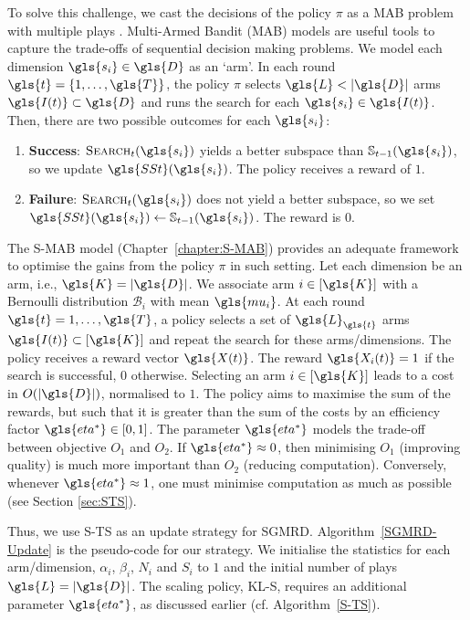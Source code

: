 To solve this challenge, we cast the decisions of the policy $\pi$ as a MAB problem with multiple plays  \cite{DBLP:conf/alt/UchiyaNK10}. Multi-Armed Bandit (MAB) models are useful tools to capture the trade-offs of sequential decision making problems. 
We model each dimension $\gls{s_i} \in \gls{D}$ as an `arm'. 
In each round $\gls{t}=\{1,\dots,\gls{T}\}$, the policy $\pi$ selects $\gls{L} < |\gls{D}|$ arms $\gls{I(t)} \subset \gls{D}$ and runs the search for each $\gls{s_i} \in \gls{I(t)}$. Then, there are two possible outcomes for each $\gls{s_i}$:  
\begin{enumerate}[noitemsep]
	\item \textbf{Success}: $\textsc{Search}_t(\gls{s_i})$ yields a better subspace than $\mathbb{S}_{t-1}(\gls{s_i})$, 
	so we update $\gls{SSt}(\gls{s_i})$. The policy receives a reward of $1$. 
	\item \textbf{Failure}: $\textsc{Search}_t(\gls{s_i})$ does not yield a better subspace, so we set $\gls{SSt}(\gls{s_i}) \gets \mathbb{S}_{{{t}}-1}(\gls{s_i})$. The reward is $0$. 
\end{enumerate}

The \acrshort{S-MAB} model \cite{DBLP:conf/kdd/FoucheKB19} (Chapter~\ref{chapter:S-MAB}) provides an adequate framework to optimise the gains from the policy $\pi$ in such setting. Let each dimension be an arm, i.e., $\gls{K} = |\gls{D}|$. We associate arm $i \in [\gls{K}]$ with a Bernoulli distribution $\mathcal{B}_i$ with mean $\gls{mu_i}$. At each round $\gls{t} = 1, \dots, \gls{T}$, a policy selects a set of $\gls{L}_{\gls{t}}$ arms $\gls{I(t)} \subset [\gls{K}]$ and repeat the search for these arms/dimensions. The policy receives a reward vector $\gls{X(t)}$. The reward $\gls{X_i(t)} = 1$ if the search is successful, $0$ otherwise. Selecting an arm $i \in [\gls{K}]$ leads to a cost in $O(|\gls{D}|)$, normalised to $1$. The policy aims to maximise the sum of the rewards, but such that it is greater than the sum of the costs by an efficiency factor $\gls{eta^*} \in [0,1]$. The parameter $\gls{eta^*}$ models the trade-off between objective $O_1$ and $O_2$. If $\gls{eta^*} \approx 0$, then minimising $O_1$ (improving quality) is much more important than $O_2$ (reducing computation). Conversely, whenever $\gls{eta^*} \approx 1$, one must minimise computation as much as possible (see Section \ref{sec:STS}). 

Thus, we use \gls{S-TS} as an update strategy for \gls{SGMRD}. Algorithm~\ref{SGMRD-Update} is the pseudo-code for our strategy. We initialise the statistics for each arm/dimension, $\alpha_i$, $\beta_i$, $N_i$ and $S_i$ to $1$ and the initial number of plays $\gls{L} = |\gls{D}|$. The scaling policy, \gls{KL-S}, requires an additional parameter $\gls{eta^*}$, as discussed earlier (cf. Algorithm~\ref{S-TS}). 


